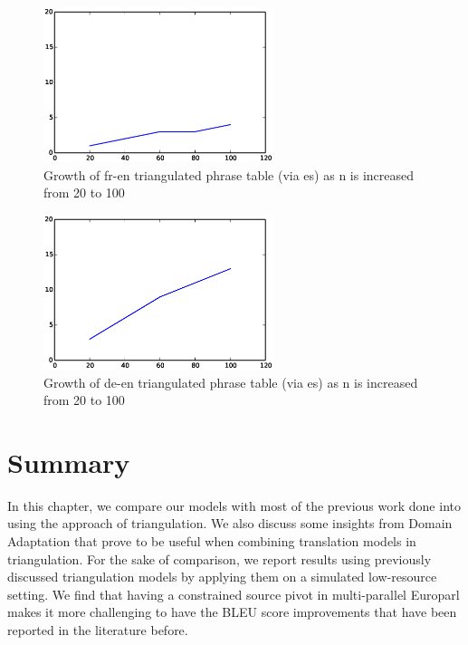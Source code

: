 	\begin{figure}[ht]
		\centering
		\includegraphics[width=0.60\textwidth]{files/Tables/fr_es_en.eps}
		\caption{Growth of fr-en triangulated phrase table (via es) as n is increased from 20 to 100}
		\label{figure:fr_es_en}
	\end{figure}

	\begin{figure}[ht]
		\centering
		\includegraphics[width=0.60\textwidth]{files/Tables/de_es_en.eps}
		\caption{Growth of de-en triangulated phrase table (via es) as n is increased from 20 to 100}
		\label{figure:de_es-en}
	\end{figure}


\section{Summary}
	In this chapter, we compare our models with most of the previous work done into using the approach of triangulation. We also discuss some insights from Domain Adaptation that prove to be useful when combining translation models in triangulation. For the sake of comparison, we report results using previously discussed triangulation models by applying them on a simulated low-resource setting. We find that having a constrained source pivot in multi-parallel Europarl makes it more challenging to have the BLEU score improvements that have been reported in the literature before. 
